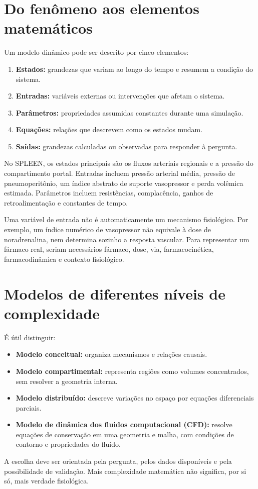 \documentclass[11pt,a4paper,oneside]{book}
\begin{document}
\section{Do fenômeno aos elementos matemáticos}
Um modelo dinâmico pode ser descrito por cinco elementos:
\begin{enumerate}
  \item \textbf{Estados:} grandezas que variam ao longo do tempo e resumem a condição do sistema.
  \item \textbf{Entradas:} variáveis externas ou intervenções que afetam o sistema.
  \item \textbf{Parâmetros:} propriedades assumidas constantes durante uma simulação.
  \item \textbf{Equações:} relações que descrevem como os estados mudam.
  \item \textbf{Saídas:} grandezas calculadas ou observadas para responder à pergunta.
\end{enumerate}

No SPLEEN, os estados principais são os fluxos arteriais regionais e a pressão do compartimento portal. Entradas incluem pressão arterial média, pressão de pneumoperitônio, um índice abstrato de suporte vasopressor e perda volêmica estimada. Parâmetros incluem resistências, complacência, ganhos de retroalimentação e constantes de tempo.

\begin{tcolorbox}[colback=green!3,colframe=green!40!black,title=Regra de interpretação]
Uma variável de entrada não é automaticamente um mecanismo fisiológico. Por exemplo, um índice numérico de vasopressor não equivale à dose de noradrenalina, nem determina sozinho a resposta vascular. Para representar um fármaco real, seriam necessários fármaco, dose, via, farmacocinética, farmacodinâmica e contexto fisiológico.
\end{tcolorbox}

\section{Modelos de diferentes níveis de complexidade}
É útil distinguir:
\begin{itemize}
  \item \textbf{Modelo conceitual:} organiza mecanismos e relações causais.
  \item \textbf{Modelo compartimental:} representa regiões como volumes concentrados, sem resolver a geometria interna.
  \item \textbf{Modelo distribuído:} descreve variações no espaço por equações diferenciais parciais.
  \item \textbf{Modelo de dinâmica dos fluidos computacional (CFD):} resolve equações de conservação em uma geometria e malha, com condições de contorno e propriedades do fluido.
\end{itemize}
A escolha deve ser orientada pela pergunta, pelos dados disponíveis e pela possibilidade de validação. Mais complexidade matemática não significa, por si só, mais verdade fisiológica.
\end{document}
